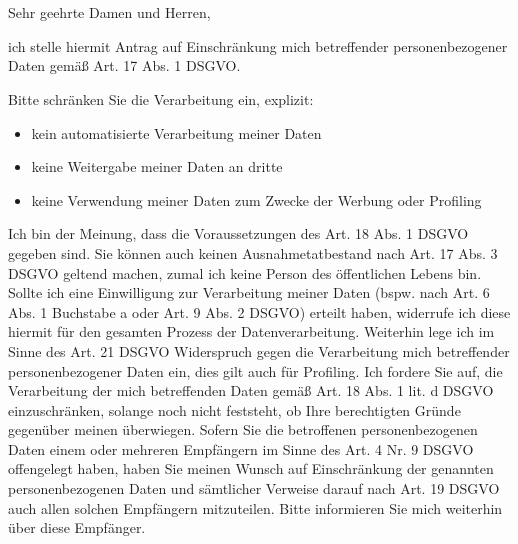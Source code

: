 \documentclass[a4paper, pagenumber=footmiddle, parskip=half,
	foldmarks=true,foldmarks=BmT, fromalign=right,
	fromphone=false, fromfax=false, fromemail=true, fromurl=false, fromlogo=false,
	fromrule=false, version=last]{scrlttr2}
\begin{document}
\begin{letter}{
	\EmpfaengerName\\
	\EmpfaengerStrasse\\
	\EmpfaengerStadt
}
\flushleft
\opening{Sehr geehrte Damen und Herren,}

ich stelle hiermit Antrag auf Einschränkung mich betreffender personenbezogener Daten gemäß Art. 17 Abs. 1 DSGVO.


Bitte schränken Sie die Verarbeitung ein, explizit:
\begin{itemize}
    \item kein automatisierte Verarbeitung meiner Daten
    \item keine Weitergabe meiner Daten an dritte
    \item keine Verwendung meiner Daten zum Zwecke der Werbung oder Profiling
\end{itemize}

Ich bin der Meinung, dass die Voraussetzungen des Art. 18 Abs. 1 DSGVO gegeben sind. Sie können auch keinen Ausnahmetatbestand nach Art. 17 Abs. 3 DSGVO geltend machen, zumal ich keine Person des öffentlichen Lebens bin.
\vspace*{5mm}
Sollte ich eine Einwilligung zur Verarbeitung meiner Daten (bspw. nach Art. 6 Abs. 1 Buchstabe a oder Art. 9 Abs. 2 DSGVO) erteilt haben, widerrufe ich diese hiermit für den gesamten Prozess der Datenverarbeitung.
Weiterhin lege ich im Sinne des Art. 21 DSGVO Widerspruch gegen die Verarbeitung mich betreffender personenbezogener Daten ein, dies gilt auch für Profiling. Ich fordere Sie auf, die Verarbeitung der mich betreffenden Daten gemäß Art. 18 Abs. 1 lit. d DSGVO einzuschränken, solange noch nicht feststeht, ob Ihre berechtigten Gründe gegenüber meinen überwiegen.
\vspace*{5mm}
Sofern Sie die betroffenen personenbezogenen Daten einem oder mehreren Empfängern im Sinne des Art. 4 Nr. 9 DSGVO offengelegt haben, haben Sie meinen Wunsch auf Einschränkung der genannten personenbezogenen Daten und sämtlicher Verweise darauf nach Art. 19 DSGVO auch allen solchen Empfängern mitzuteilen. Bitte informieren Sie mich weiterhin über diese Empfänger.


\end{letter}
\end{document}
